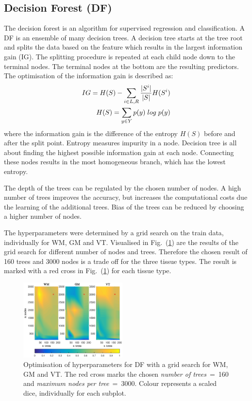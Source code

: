 \documentclass[journal]{IEEEtran}
\begin{document}
\subsection{Decision Forest (DF)}
The decision forest is an algorithm for supervised regression and classification. A DF is an ensemble of many decision trees. A decision tree starts at the tree root and splits the data based on the feature which results in the largest information gain (IG). The splitting procedure is repeated at each child node down to the terminal nodes. The terminal nodes at the bottom are the resulting predictors. The optimisation of the information gain is described as:
\begin{equation}
	\begin{split}
		IG = H(S) -\sum_{i \in {L,R}} \frac{ \vert S ^i \vert}{\vert S \vert} H(S^i) \\
		H(S) = \sum_{y \in Y} p(y) \hspace{0.1 cm} log \hspace{0.1 cm}  p(y)\\
	\end{split}
\end{equation}
where the information gain is the difference of the entropy $H(S)$ before and after the split point. Entropy measures impurity in a node. Decision tree is all about finding the highest possible information gain at each node. Connecting these nodes results in the most homogeneous branch, which has the lowest entropy.

The depth of the trees can be regulated by the chosen number of nodes. A high number of trees improves the accuracy, but increases the computational costs due the learning of the additional trees. Bias of the trees can be reduced by choosing a higher number of nodes.

The hyperparameters were determined by a grid search on the train data, individually for WM, GM and VT. Visualised in Fig.~(\ref{f.df_gridsearch}) are the results of the grid search for different number of nodes and trees. Therefore the chosen result of 160 trees and 3000 nodes is a trade off for the three tissue types. The result is marked with a red cross in Fig.~(\ref{f.df_gridsearch})  for each tissue type.

\begin{figure}[h!]
	\centering
	\includegraphics[width=0.48\textwidth]{images/df_grid}
	\caption{Optimisation of hyperparameters for DF with a grid search for WM, GM and VT. The red cross marks the chosen \textit{number of trees}~=~160 and \textit{maximum nodes per tree}~=~3000. Colour represents a scaled dice, individually for each subplot.}\label{f.df_gridsearch}
\end{figure}
\end{document}
